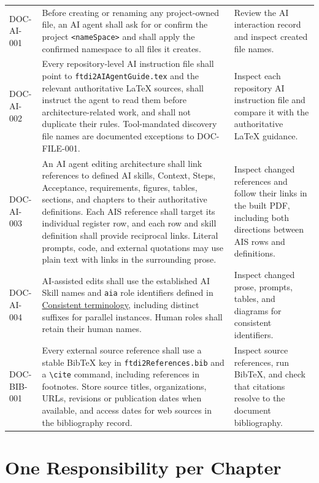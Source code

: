 \begin{tabularx}{\linewidth}{L{2.5cm}Y L{3.0cm}}
DOC-AI-001 & Before creating or renaming any project-owned file, an AI agent
shall ask for or confirm the project \texttt{\textless nameSpace\textgreater}
and shall apply the confirmed namespace to all files it creates. & Review the
AI interaction record and inspect created file names.\\
DOC-AI-002 & Every repository-level AI instruction file shall point to
\texttt{ftdi2AIAgentGuide.tex} and the relevant authoritative LaTeX sources,
shall instruct the agent to read them before architecture-related work, and
shall not duplicate their rules. Tool-mandated discovery file names are
documented exceptions to DOC-FILE-001. & Inspect each repository AI instruction
file and compare it with the authoritative LaTeX guidance.\\
\label{Requirement:DOCAI003}DOC-AI-003 & An AI agent editing
architecture shall link references to defined AI skills, Context, Steps,
Acceptance, requirements, figures, tables, sections, and chapters to their
authoritative definitions. Each AIS reference shall target its individual
register row, and each row and skill definition shall provide reciprocal links.
Literal prompts, code, and external quotations may use plain text with links
in the surrounding prose. & Inspect changed references and follow their links
in the built PDF, including both directions between AIS rows and definitions.\\
\label{Requirement:DOCAI004}DOC-AI-004 & AI-assisted edits shall use the established AI Skill names and \texttt{aia} role identifiers defined in \hyperref[Rule:AITerminologyConsistency]{Consistent terminology}, including distinct suffixes for parallel instances. Human roles shall retain their human names. & Inspect changed prose, prompts, tables, and diagrams for consistent identifiers.\\
\label{Requirement:DOCBIB001}DOC-BIB-001 & Every external source reference shall use a stable BibTeX key in \texttt{ftdi2References.bib} and a \texttt{\textbackslash cite} command, including references in footnotes. Store source titles, organizations, URLs, revisions or publication dates when available, and access dates for web sources in the bibliography record. & Inspect source references, run BibTeX, and check that citations resolve to the document bibliography.\\
\end{tabularx}
\normalsize

\section{One Responsibility per Chapter}
\label{Section:ChapterResponsibilityConvention}

